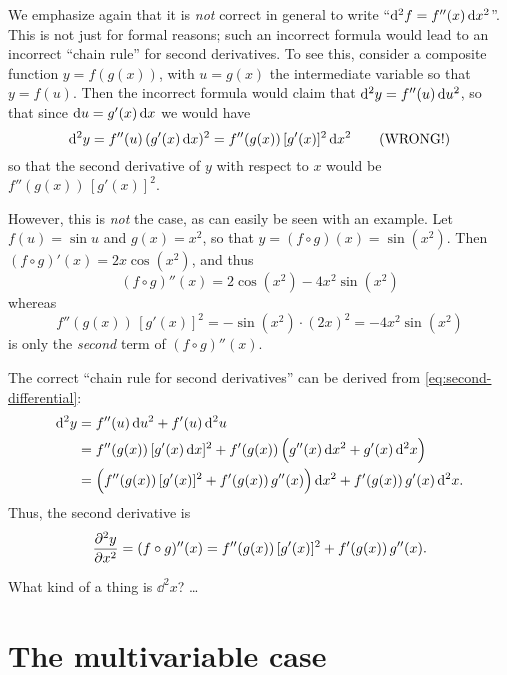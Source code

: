 \documentclass[12pt]{amsart}
\begin{document}
\begin{rmk}
  We emphasize again that it is \emph{not} correct in general to write ``$\mathrm{d}^2f = f''(x) \,\mathrm{d} x^2$''.
  This is not just for formal reasons; such an incorrect formula would lead to an incorrect ``chain rule'' for second derivatives.
  To see this, consider a composite function $y = f(g(x))$, with $u = g(x)$ the intermediate variable so that $y = f(u)$.
  Then the incorrect formula would claim that $\mathrm{d}^2y = f''(u)\,\mathrm{d} u^2 $, so that since $\mathrm{d} u = g'(x) \,\mathrm{d} x$ we would have
  \[ \mathrm{d}^2y = f''(u)\,(g'(x)\,\mathrm{d} x)^2 = f''(g(x))\, [g'(x)]^2 \,\mathrm{d} x^2 \qquad\text{(WRONG!)} \]
  so that the second derivative of $y$ with respect to $x$ would be $f''(g(x))\, [g'(x)]^2$.

  However, this is \emph{not} the case, as can easily be seen with an example.
  Let $f(u) = \sin u$ and $g(x) = x^2$, so that $y = (f\circ g)(x) = \sin(x^2)$.
  Then $(f\circ g)'(x) = 2x\cos (x^2)$, and thus
  \[ (f\circ g)''(x) = 2 \cos (x^2) - 4x^2 \sin(x^2) \]
  whereas
  \[ f''(g(x))\, [g'(x)]^2 = -\sin(x^2) \cdot (2x)^2 = -4x^2\sin(x^2) \]
  is only the \emph{second} term of $(f\circ g)''(x)$.

  The correct ``chain rule for second derivatives'' can be derived from \cref{eq:second-differential}:
  \begin{align*}
    \mathrm{d}^2y &= f''(u) \,\mathrm{d} u^2 + f'(u) \,\mathrm{d}^2u\\
    &= f''(g(x)) \, [g'(x) \, \mathrm{d} x]^2 + f'(g(x)) \, \Big(g''(x) \, \mathrm{d} x^2 + g'(x) \, \mathrm{d}^2 x\Big)\\
    &= \Big( f''(g(x)) \,[g'(x)]^2 + f'(g(x))\, g''(x)\Big) \, \mathrm{d} x^2 + f'(g(x))\, g'(x)\,\mathrm{d}^2x.
  \end{align*}
  Thus, the second derivative is
  \[ \frac{\partial^2 y}{\partial x^2} = (f\circ g)''(x) = f''(g(x)) \,[g'(x)]^2 + f'(g(x))\, g''(x). \]
\end{rmk}

What kind of a thing is $\dd^2x$? \dots %

\section{The multivariable case}
\label{sec:multivariable-second-differentials}

\end{document}
